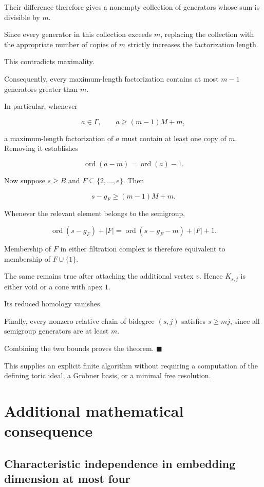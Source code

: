 \documentclass[11pt]{article}
\begin{document}
Their difference therefore gives a nonempty collection of generators whose sum is divisible by \(m\).

Since every generator in this collection exceeds \(m\), replacing the collection with the appropriate number of copies of \(m\) strictly increases the factorization length.

This contradicts maximality.

Consequently, every maximum-length factorization contains at most \(m-1\) generators greater than \(m\).

In particular, whenever

\[
a\in\Gamma,\qquad a\ge(m-1)M+m,
\]

a maximum-length factorization of \(a\) must contain at least one copy of \(m\). Removing it establishes

\[
\operatorname{ord}(a-m)
=\operatorname{ord}(a)-1.
\]

Now suppose \(s\ge B\) and \(F\subseteq\{2,\ldots,e\}\). Then

\[
s-g_F\ge(m-1)M+m.
\]

Whenever the relevant element belongs to the semigroup,

\[
\operatorname{ord}(s-g_F)+|F|
=
\operatorname{ord}(s-g_F-m)+|F|+1.
\]

Membership of \(F\) in either filtration complex is therefore equivalent to membership of \(F\cup\{1\}\).

The same remains true after attaching the additional vertex \(v\). Hence \(K_{s,j}\) is either void or a cone with apex \(1\).

Its reduced homology vanishes.

Finally, every nonzero relative chain of bidegree \((s,j)\) satisfies \(s\ge mj\), since all semigroup generators are at least \(m\).

Combining the two bounds proves the theorem. \(\blacksquare\)

This supplies an explicit finite algorithm without requiring a computation of the defining toric ideal, a Gröbner basis, or a minimal free resolution.

\section{Additional mathematical consequence}

\subsection{Characteristic independence in embedding dimension at most four}
\end{document}
